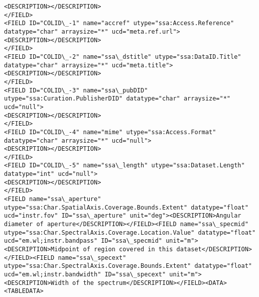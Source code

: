 \documentclass[11pt]{article}
\begin{document}
\begin{Verbatim}[commandchars=\\\{\}]
<DESCRIPTION></DESCRIPTION>
</FIELD>
<FIELD ID="COLID\_-1" name="accref" utype="ssa:Access.Reference" datatype="char" arraysize="*" ucd="meta.ref.url">
<DESCRIPTION></DESCRIPTION>
</FIELD>
<FIELD ID="COLID\_-2" name="ssa\_dstitle" utype="ssa:DataID.Title" datatype="char" arraysize="*" ucd="meta.title">
<DESCRIPTION></DESCRIPTION>
</FIELD>
<FIELD ID="COLID\_-3" name="ssa\_pubDID" utype="ssa:Curation.PublisherDID" datatype="char" arraysize="*" ucd="null">
<DESCRIPTION></DESCRIPTION>
</FIELD>
<FIELD ID="COLID\_-4" name="mime" utype="ssa:Access.Format" datatype="char" arraysize="*" ucd="null">
<DESCRIPTION></DESCRIPTION>
</FIELD>
<FIELD ID="COLID\_-5" name="ssa\_length" utype="ssa:Dataset.Length" datatype="int" ucd="null">
<DESCRIPTION></DESCRIPTION>
</FIELD>
<FIELD name="ssa\_aperture" utype="ssa:Char.SpatialAxis.Coverage.Bounds.Extent" datatype="float" ucd="instr.fov" ID="ssa\_aperture" unit="deg"><DESCRIPTION>Angular diameter of aperture</DESCRIPTION></FIELD><FIELD name="ssa\_specmid" utype="ssa:Char.SpectralAxis.Coverage.Location.Value" datatype="float" ucd="em.wl;instr.bandpass" ID="ssa\_specmid" unit="m"><DESCRIPTION>Midpoint of region covered in this dataset</DESCRIPTION></FIELD><FIELD name="ssa\_specext" utype="ssa:Char.SpectralAxis.Coverage.Bounds.Extent" datatype="float" ucd="em.wl;instr.bandwidth" ID="ssa\_specext" unit="m"><DESCRIPTION>Width of the spectrum</DESCRIPTION></FIELD><DATA><TABLEDATA>

\end{Verbatim}
\end{document}
